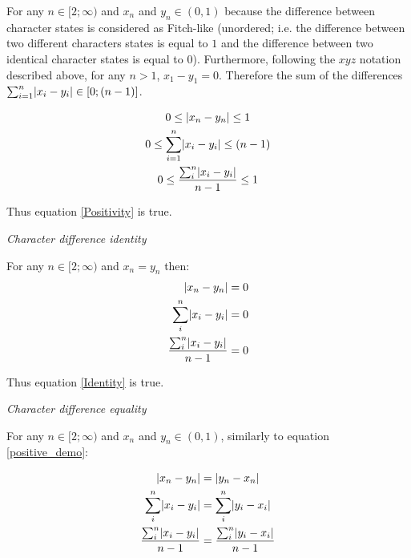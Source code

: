 \documentclass[12pt,letterpaper]{article}
\DeclarePairedDelimiter\abs{\lvert}{\rvert}%
\renewcommand{\subsection}[1]{%
\bigskip
\begin{center}
\begin{large}
\normalfont\itshape #1
\end{large}
\end{center}}
\begin{document}
For any $n \in [2;\infty)$ and $x_{n}$ and $y_{n} \in (0,1)$ because the difference between character states is considered as Fitch-like (unordered; i.e. the difference between two different characters states is equal to $1$ and the difference between two identical character states is equal to $0$).
Furthermore, following the $xyz$ notation described above, for any $n > 1$, $x_{1}-y_{1}=0$.
Therefore the sum of the differences $\sum_{i=1}^{n}\abs{x_{i}-y_{i}} \in [0;(n-1)]$.

\begin{equation}
    \label{positive_demo}
    \begin{gathered}
    0 \leq  \abs{x_{n}-y_{n}} \leq 1\\
    0 \leq  \sum_{i=1}^{n}\abs{x_{i}-y_{i}} \leq (n-1)\\
    0 \leq  \frac{\sum_{i}^{n}\abs{x_{i}-y_{i}}}{n-1} \leq 1\\
    \end{gathered}
\end{equation}

Thus equation \ref{Positivity} is true.

\newpage

\subsection{Character difference identity}

For any $n \in [2;\infty)$ and $x_{n} = y_{n}$ then:
\begin{equation}
    \label{identitydemo}
    \begin{aligned}
    \abs{x_{n}-y_{n}} &= 0\\
    \sum_{i}^{n}\abs{x_{i}-y_{i}} &= 0\\
    \frac{\sum_{i}^{n}\abs{x_{i}-y_{i}}}{n-1} &= 0\\
    \end{aligned}
\end{equation}

Thus equation \ref{Identity} is true.

\subsection{Character difference equality}

For any $n \in [2;\infty)$ and $x_{n}$ and $y_{n} \in (0,1)$, similarly to equation \ref{positive_demo}:

\begin{equation}
    \label{equality_demo}
    \begin{aligned}
    \abs{x_{n}-y_{n}} &= \abs{y_{n}-x_{n}}\\
    \sum_{i}^{n}\abs{x_{i}-y_{i}} &= \sum_{i}^{n}\abs{y_{i}-x_{i}}\\
    \frac{\sum_{i}^{n}\abs{x_{i}-y_{i}}}{n-1} &= \frac{\sum_{i}^{n}\abs{y_{i}-x_{i}}}{n-1}\\
    \end{aligned}
\end{equation}
\end{document}
